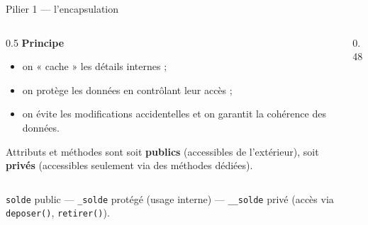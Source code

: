 \documentclass[11pt,aspectratio=169]{beamer}
\newcommand{\py}[1]{\texttt{#1}}
\begin{document}
\begin{frame}[fragile,shrink=5]{Pilier 1 --- l'encapsulation}
  \begin{columns}[T,onlytextwidth]
    \begin{column}{0.5\textwidth}
      \textbf{Principe}
      \begin{itemize}
        \item on « cache » les détails internes ;
        \item on protège les données en contrôlant leur accès ;
        \item on évite les modifications accidentelles et on garantit la
              cohérence des données.
      \end{itemize}
      \smallskip
      \smallskip
      Attributs et méthodes sont soit \textbf{publics} (accessibles de
      l'extérieur), soit \textbf{privés} (accessibles seulement via des
      méthodes dédiées).
    \end{column}
    \begin{column}{0.48\textwidth}
      \begin{center}
      \end{center}
    \end{column}
  \end{columns}
  \vspace{-2mm}
  \begin{defi}
    \py{solde} public --- \py{\_solde} protégé (usage interne) ---
    \py{\_\_solde} privé (accès via \py{deposer()}, \py{retirer()}).
  \end{defi}
\end{frame}
\end{document}
